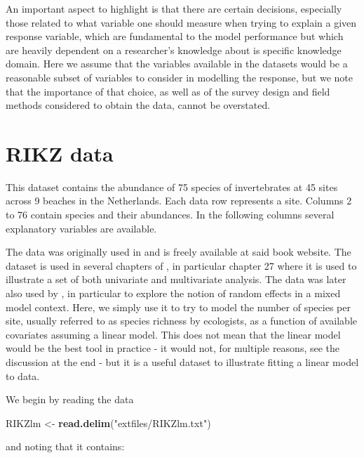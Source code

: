 \documentclass[
]{book}
\newenvironment{Shaded}{\begin{snugshade}}{\end{snugshade}}
\newcommand{\FunctionTok}[1]{\textcolor[rgb]{0.13,0.29,0.53}{\textbf{#1}}}
\newcommand{\NormalTok}[1]{#1}
\newcommand{\OtherTok}[1]{\textcolor[rgb]{0.56,0.35,0.01}{#1}}
\newcommand{\StringTok}[1]{\textcolor[rgb]{0.31,0.60,0.02}{#1}}
\begin{document}
An important aspect to highlight is that there are certain decisions, especially those related to what variable one should measure when trying to explain a given response variable, which are fundamental to the model performance but which are heavily dependent on a researcher's knowledge about is specific knowledge domain. Here we assume that the variables available in the datasets would be a reasonable subset of variables to consider in modelling the response, but we note that the importance of that choice, as well as of the survey design and field methods considered to obtain the data, cannot be overstated.

\section{RIKZ data}\label{rikz-data}

This dataset contains the abundance of 75 species of invertebrates at 45 sites across 9 beaches in the Netherlands. Each data row represents a site. Columns 2 to 76 contain species and their abundances. In the following columns several explanatory variables are available.

The data was originally used in \citet{Zuur2007} and is freely available at said book website. The dataset is used in several chapters of \citet{Zuur2007}, in particular chapter 27 \citet{Janssen2007} where it is used to illustrate a set of both univariate and multivariate analysis. The data was later also used by \citet{Zuur2009b}, in particular to explore the notion of random effects in a mixed model context. Here, we simply use it to try to model the number of species per site, usually referred to as species richness by ecologists, as a function of available covariates assuming a linear model. This does not mean that the linear model would be the best tool in practice - it would not, for multiple reasons, see the discussion at the end - but it is a useful dataset to illustrate fitting a linear model to data.

We begin by reading the data

\begin{Shaded}
\begin{Highlighting}[]
\NormalTok{RIKZlm }\OtherTok{\textless{}{-}} \FunctionTok{read.delim}\NormalTok{(}\StringTok{"extfiles/RIKZlm.txt"}\NormalTok{)}
\end{Highlighting}
\end{Shaded}

and noting that it contains:
\end{document}
